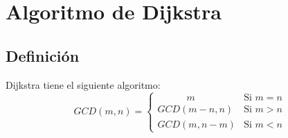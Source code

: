 \chapter{Algoritmo de Dijkstra}
\section{Definición}
Dijkstra tiene el siguiente algoritmo:
\begin{equation*}
GCD(m,n)=
 \begin{cases}
    \quad \qquad m & \text{Si $m=n$}\\
    GCD(m-n,n) & \text{Si $m>n$}\\
    GCD(m,n-m) & \text{Si $m<n$}
 \end{cases}
\end{equation*}

